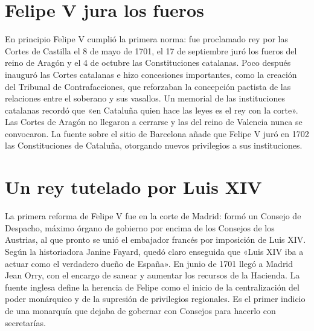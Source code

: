 \documentclass{book}
\begin{document}

\section{Felipe V jura los fueros}

En principio Felipe V cumplió la primera norma: fue proclamado rey por las Cortes de Castilla el 8 de mayo de 1701, el 17 de septiembre juró los fueros del reino de Aragón y el 4 de octubre las Constituciones catalanas. Poco después inauguró las Cortes catalanas e hizo concesiones importantes, como la creación del Tribunal de Contrafacciones, que reforzaban la concepción pactista de las relaciones entre el soberano y sus vasallos. Un memorial de las instituciones catalanas recordó que «en Cataluña quien hace las leyes es el rey con la corte». Las Cortes de Aragón no llegaron a cerrarse y las del reino de Valencia nunca se convocaron. La fuente sobre el sitio de Barcelona añade que Felipe V juró en 1702 las Constituciones de Cataluña, otorgando nuevos privilegios a sus instituciones.


\section{Un rey tutelado por Luis XIV}

La primera reforma de Felipe V fue en la corte de Madrid: formó un Consejo de Despacho, máximo órgano de gobierno por encima de los Consejos de los Austrias, al que pronto se unió el embajador francés por imposición de Luis XIV. Según la historiadora Janine Fayard, quedó claro enseguida que «Luis XIV iba a actuar como el verdadero dueño de España». En junio de 1701 llegó a Madrid Jean Orry, con el encargo de sanear y aumentar los recursos de la Hacienda. La fuente inglesa define la herencia de Felipe como el inicio de la centralización del poder monárquico y de la supresión de privilegios regionales. Es el primer indicio de una monarquía que dejaba de gobernar con Consejos para hacerlo con secretarías.

\end{document}
